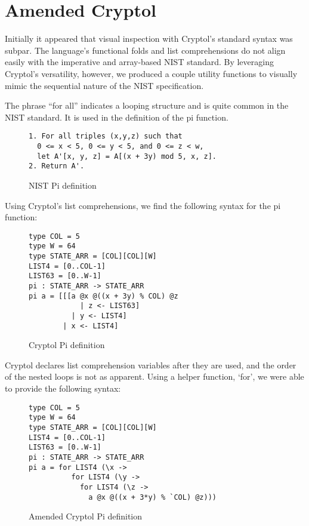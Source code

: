 \section{Amended Cryptol}
\label{sec:amended}
Initially it appeared that visual inspection with Cryptol’s standard syntax was subpar.
The language's functional folds and list comprehensions do not align easily with the imperative 
and array-based NIST standard. By leveraging Cryptol’s versatility, however, we produced a couple 
utility functions to visually mimic the sequential nature of the NIST specification. 

The phrase “for all” indicates a looping structure and is quite common in the NIST standard. 
It is used in the definition of the pi function.

\begin{figure}[h]
  \centering
  \begin{verbatim}
1. For all triples (x,y,z) such that 
  0 <= x < 5, 0 <= y < 5, and 0 <= z < w,
  let A'[x, y, z] = A[(x + 3y) mod 5, x, z].
2. Return A'.
  \end{verbatim}
  \caption{NIST Pi definition}
  \label{fig:nistPi}
\end{figure}
    
Using Cryptol's list comprehensions, we find the following syntax for the pi function:

\begin{figure}[h]
  \centering
\begin{verbatim}
type COL = 5 
type W = 64
type STATE_ARR = [COL][COL][W]
LIST4 = [0..COL-1]
LIST63 = [0..W-1]
pi : STATE_ARR -> STATE_ARR
pi a = [[[a @x @((x + 3y) % COL) @z 
            | z <- LIST63] 
          | y <- LIST4] 
        | x <- LIST4]
\end{verbatim}
\caption{Cryptol Pi definition}
\label{fig:cryptolPi}
\end{figure}

Cryptol declares list comprehension variables after they are used, and the order of the
nested loops is not as apparent. Using a helper function, ‘for’, we were able to provide
the following syntax:

\begin{figure}[h]
  \centering
\begin{verbatim}
type COL = 5 
type W = 64
type STATE_ARR = [COL][COL][W]
LIST4 = [0..COL-1]
LIST63 = [0..W-1]
pi : STATE_ARR -> STATE_ARR
pi a = for LIST4 (\x ->
          for LIST4 (\y -> 
            for LIST4 (\z -> 
              a @x @((x + 3*y) % `COL) @z)))
\end{verbatim}
\caption{Amended Cryptol Pi definition}
\label{fig:cryptolAmendedPi}
\end{figure}

